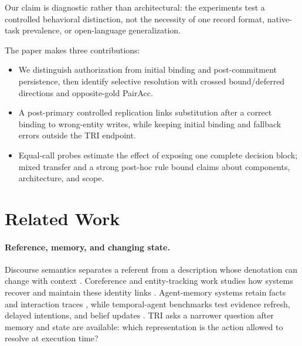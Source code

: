 \documentclass[letterpaper]{article}
\begin{document}
Our claim is diagnostic rather than architectural: the experiments test a controlled behavioral
distinction, not the necessity of one record format, native-task prevalence, or open-language
generalization.

The paper makes three contributions:
\nopagebreak[4]
\begin{itemize}
    \item We distinguish authorization from initial binding and post-commitment persistence, then
    identify selective resolution with crossed bound/deferred directions and opposite-gold PairAcc.
    \item A post-primary controlled replication links substitution after a correct binding to
    wrong-entity writes, while keeping initial binding and fallback errors outside the TRI endpoint.
    \item Equal-call probes estimate the effect of exposing one complete decision block; mixed
    transfer and a strong post-hoc rule bound claims about components, architecture, and scope.
\end{itemize}

\section{Related Work}

\paragraph{Reference, memory, and changing state.}
Discourse semantics separates a referent from a description whose denotation can change with
context \cite{kamp1993discourse,grosz1995centering}. Coreference and entity-tracking work studies
how systems recover and maintain these identity links
\cite{lee2017coreference,joshi2020spanbert,tang2026entitytracking}. Agent-memory systems retain facts
and interaction traces \cite{packer2023memgpt,sumers2024coala}, while temporal-agent benchmarks test
evidence refresh, delayed intentions, and belief updates
\cite{cheng2026temporalblindness,liu2026pmbench,ji2026clawarena,xu2026evoarena}. TRI asks a narrower
question after memory and state are available: which representation is the action allowed to
resolve at execution time?
\end{document}
